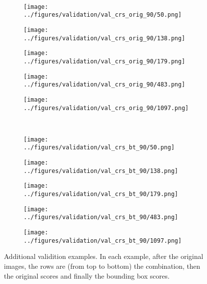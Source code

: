 \begin{figure}[h!]
		\vspace{-0.35cm}
	\\
	\begin{subfigure}{0.19\textwidth}
		\centering
		\texttt{[image: ../figures/validation/val\_crs\_orig\_90/50.png]}
		\label{fig:1}
	\end{subfigure}
	\begin{subfigure}{0.19\textwidth}
		\centering
		\texttt{[image: ../figures/validation/val\_crs\_orig\_90/138.png]}
		\label{fig:1}
	\end{subfigure}
	\begin{subfigure}{0.19\textwidth}
		\centering
		\texttt{[image: ../figures/validation/val\_crs\_orig\_90/179.png]}
		\label{fig:1}
	\end{subfigure}
	\begin{subfigure}{0.19\textwidth}
		\centering
		\texttt{[image: ../figures/validation/val\_crs\_orig\_90/483.png]}
		\label{fig:1}
	\end{subfigure}
	\begin{subfigure}{0.19\textwidth}
		\centering
		\texttt{[image: ../figures/validation/val\_crs\_orig\_90/1097.png]}
		\label{fig:1}
	\end{subfigure}
			\vspace{-0.35cm}
	\\
	\begin{subfigure}{0.19\textwidth}
		\centering
		\texttt{[image: ../figures/validation/val\_crs\_bt\_90/50.png]}
		\label{fig:1}
	\end{subfigure}
	\begin{subfigure}{0.19\textwidth}
		\centering
		\texttt{[image: ../figures/validation/val\_crs\_bt\_90/138.png]}
		\label{fig:1}
	\end{subfigure}
	\begin{subfigure}{0.19\textwidth}
		\centering
		\texttt{[image: ../figures/validation/val\_crs\_bt\_90/179.png]}
		\label{fig:1}
	\end{subfigure}
	\begin{subfigure}{0.19\textwidth}
		\centering
		\texttt{[image: ../figures/validation/val\_crs\_bt\_90/483.png]}
		\label{fig:1}
	\end{subfigure}
	\begin{subfigure}{0.19\textwidth}
		\centering
		\texttt{[image: ../figures/validation/val\_crs\_bt\_90/1097.png]}
		\label{fig:1}
	\end{subfigure}
	\label{fig:grid}
	\caption{Additional validition examples. In each example, after the original images, the rows are (from top to bottom) the combination, then the original scores and finally the bounding box scores.}\label{fig:polpysex2}
\end{figure}

